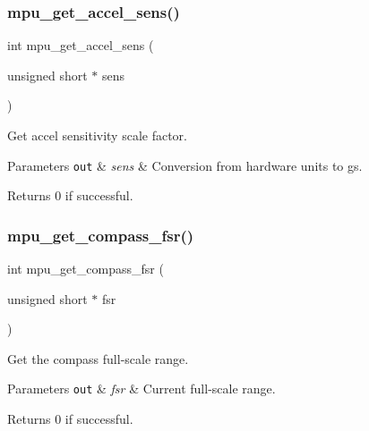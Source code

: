 \subsubsection{mpu\+\_\+get\+\_\+accel\+\_\+sens()}
{\footnotesize\ttfamily int mpu\+\_\+get\+\_\+accel\+\_\+sens (\begin{DoxyParamCaption}\item[{unsigned short $\ast$}]{sens }\end{DoxyParamCaption})}



Get accel sensitivity scale factor. 


\begin{DoxyParams}[1]{Parameters}
\mbox{\tt out}  & {\em sens} & Conversion from hardware units to g\textquotesingle{}s. \\
\hline
\end{DoxyParams}
\begin{DoxyReturn}{Returns}
0 if successful. 
\end{DoxyReturn}
\mbox{\label{group___d_r_i_v_e_r_s_gade8589573d09e0f14b84130428f286df}} 
\subsubsection{mpu\+\_\+get\+\_\+compass\+\_\+fsr()}
{\footnotesize\ttfamily int mpu\+\_\+get\+\_\+compass\+\_\+fsr (\begin{DoxyParamCaption}\item[{unsigned short $\ast$}]{fsr }\end{DoxyParamCaption})}



Get the compass full-\/scale range. 


\begin{DoxyParams}[1]{Parameters}
\mbox{\tt out}  & {\em fsr} & Current full-\/scale range. \\
\hline
\end{DoxyParams}
\begin{DoxyReturn}{Returns}
0 if successful. 
\end{DoxyReturn}
\mbox{\label{group___d_r_i_v_e_r_s_gab413570dac5535f068c5ac8eddcc7354}} 
